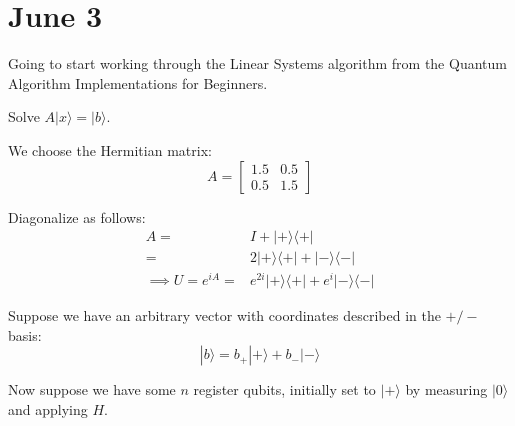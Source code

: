 \documentclass[]{article}
\newcommand{\bra}[1]{\langle #1 |}
\newcommand{\ket}[1]{| #1 \rangle}
\begin{document}
\section{June 3}
Going to start working through the Linear Systems algorithm from the Quantum Algorithm Implementations for Beginners.

Solve $A\ket{x}=\ket{b}$.

We choose the Hermitian matrix:
\[A = \left[\begin{matrix}
1.5&0.5\\
0.5&1.5
\end{matrix}\right]\]

Diagonalize as follows:
\begin{align*}
A =& I + \ket{+}\bra{+}
\\=& 2\ket{+}\bra{+} + \ket{-}\bra{-}
\\\implies U=e^{iA} =& e^{2i}\ket{+}\bra{+} + e^{i}\ket{-}\bra{-}
\end{align*}

Suppose we have an arbitrary vector with coordinates described in the $+/-$ basis:
\[\ket{b} = b_+\ket{+}+b_-\ket{-}\]

Now suppose we have some $n$ register qubits, initially set to $\ket{+}$ by measuring $\ket{0}$ and applying $H$.
\end{document}
